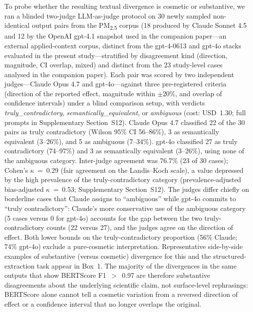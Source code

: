 \documentclass[sn-nature]{sn-jnl}
\begin{document}
To probe whether the resulting textual divergence is cosmetic or substantive, we ran a blinded two-judge LLM-as-judge protocol on 30 newly sampled non-identical output pairs from the PM\textsubscript{2.5} corpus (18 produced by Claude Sonnet 4.5 and 12 by the OpenAI gpt-4.1 snapshot used in the companion paper---an external applied-context corpus, distinct from the gpt-4-0613 and gpt-4o stacks evaluated in the present study---stratified by disagreement kind (direction, magnitude, CI overlap, mixed) and distinct from the 23 study-level cases analysed in the companion paper).
Each pair was scored by two independent judges---Claude Opus 4.7 and gpt-4o---against three pre-registered criteria (direction of the reported effect, magnitude within $\pm$20\%, and overlap of confidence intervals) under a blind comparison setup, with verdicts \emph{truly\_contradictory}, \emph{semantically\_equivalent}, or \emph{ambiguous} (cost: USD~1.30; full prompts in Supplementary Section~S12).
Claude Opus 4.7 classified 22 of the 30 pairs as truly contradictory (Wilson 95\% CI 56--86\%), 3 as semantically equivalent (3--26\%), and 5 as ambiguous (7--34\%). gpt-4o classified 27 as truly contradictory (74--97\%) and 3 as semantically equivalent (3--26\%), using none of the ambiguous category.
Inter-judge agreement was 76.7\% (23 of 30 cases); Cohen's $\kappa$~=~0.29 (fair agreement on the Landis--Koch scale), a value depressed by the high prevalence of the truly-contradictory category (prevalence-adjusted bias-adjusted $\kappa$~=~0.53; Supplementary Section~S12). The judges differ chiefly on borderline cases that Claude assigns to ``ambiguous'' while gpt-4o commits to ``truly contradictory'': Claude's more conservative use of the ambiguous category (5 cases versus 0 for gpt-4o) accounts for the gap between the two truly-contradictory counts (22 versus 27), and the judges agree on the direction of effect.
Both lower bounds on the truly-contradictory proportion (56\% Claude; 74\% gpt-4o) exclude a pure-cosmetic interpretation. Representative side-by-side examples of substantive (versus cosmetic) divergence for this and the structured-extraction task appear in Box~1.
The majority of the divergences in the same outputs that show BERTScore F1~$>$~0.97 are therefore substantive disagreements about the underlying scientific claim, not surface-level rephrasings: BERTScore alone cannot tell a cosmetic variation from a reversed direction of effect or a confidence interval that no longer overlaps the original.
\end{document}
